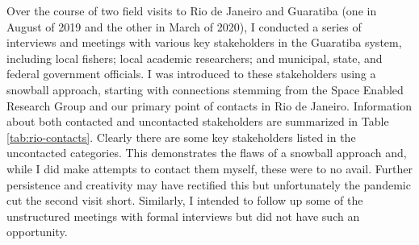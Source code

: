 Over the course of two field visits to Rio de Janeiro and Guaratiba (one in August of 2019 and the other in March of 2020), I conducted a series of interviews and meetings with various key stakeholders in the Guaratiba system, including local fishers; local academic researchers; and municipal, state, and federal government officials. I was introduced to these stakeholders using a snowball approach, starting with connections stemming from the Space Enabled Research Group and our primary point of contacts in Rio de Janeiro. Information about both contacted and uncontacted stakeholders are summarized in Table \ref{tab:rio-contacts}. Clearly there are some key stakeholders listed in the uncontacted categories. This demonstrates the flaws of a snowball approach and, while I did make attempts to contact them myself, these were to no avail. Further persistence and creativity may have rectified this but unfortunately the pandemic cut the second visit short. Similarly, I intended to follow up some of the unstructured meetings with formal interviews but did not have such an opportunity.

